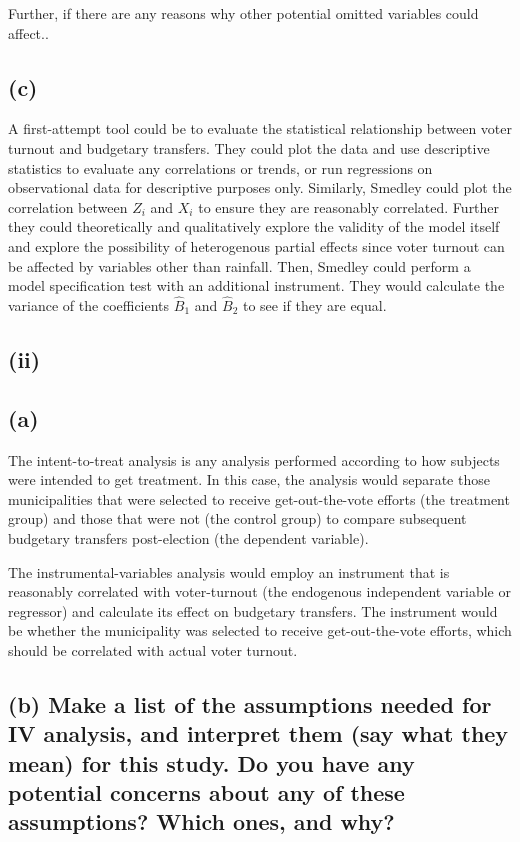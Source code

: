 \documentclass[
]{article}
\begin{document}
Further, if there are any reasons why other potential omitted variables
could affect..

\hypertarget{c}{%
\subsection{(c)}\label{c}}

A first-attempt tool could be to evaluate the statistical relationship
between voter turnout and budgetary transfers. They could plot the data
and use descriptive statistics to evaluate any correlations or trends,
or run regressions on observational data for descriptive purposes only.
Similarly, Smedley could plot the correlation between \(Z_{i}\) and
\(X_{i}\) to ensure they are reasonably correlated. Further they could
theoretically and qualitatively explore the validity of the model itself
and explore the possibility of heterogenous partial effects since voter
turnout can be affected by variables other than rainfall. Then, Smedley
could perform a model specification test with an additional instrument.
They would calculate the variance of the coefficients \(\hat B_{1}\) and
\(\hat B_{2}\) to see if they are equal.

\hypertarget{ii}{%
\subsection{(ii)}\label{ii}}

\hypertarget{a}{%
\subsection{(a)}\label{a}}

The intent-to-treat analysis is any analysis performed according to how
subjects were intended to get treatment. In this case, the analysis
would separate those municipalities that were selected to receive
get-out-the-vote efforts (the treatment group) and those that were not
(the control group) to compare subsequent budgetary transfers
post-election (the dependent variable).

The instrumental-variables analysis would employ an instrument that is
reasonably correlated with voter-turnout (the endogenous independent
variable or regressor) and calculate its effect on budgetary transfers.
The instrument would be whether the municipality was selected to receive
get-out-the-vote efforts, which should be correlated with actual voter
turnout.

\hypertarget{b-make-a-list-of-the-assumptions-needed-for-iv-analysis-and-interpret-them-say-what-they-mean-for-this-study.-do-you-have-any-potential-concerns-about-any-of-these-assumptions-which-ones-and-why}{%
\subsection{(b) Make a list of the assumptions needed for IV analysis,
and interpret them (say what they mean) for this study. Do you have any
potential concerns about any of these assumptions? Which ones, and
why?}\label{b-make-a-list-of-the-assumptions-needed-for-iv-analysis-and-interpret-them-say-what-they-mean-for-this-study.-do-you-have-any-potential-concerns-about-any-of-these-assumptions-which-ones-and-why}}
\end{document}
